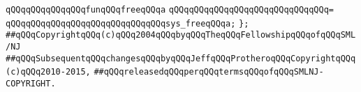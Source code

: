 \newline
\verb|qQQqqQQqqQQqqQQqfunqQQqfreeqQQqa|\newline
\verb|qQQqqQQqqQQqqQQqqQQqqQQqqQQqqQQq=|\newline
\verb|qQQqqQQqqQQqqQQqqQQqqQQqqQQqqQQqsys_freeqQQqa;|\newline
\verb|};|\newline
\newline
\newline
\verb|##qQQqCopyrightqQQq(c)qQQq2004qQQqbyqQQqTheqQQqFellowshipqQQqofqQQqSML/NJ|\newline
\verb|##qQQqSubsequentqQQqchangesqQQqbyqQQqJeffqQQqProtheroqQQqCopyrightqQQq(c)qQQq2010-2015,|\newline
\verb|##qQQqreleasedqQQqperqQQqtermsqQQqofqQQqSMLNJ-COPYRIGHT.|\newline

